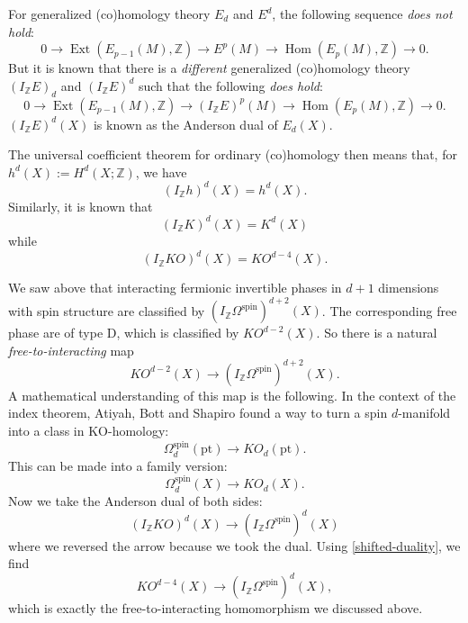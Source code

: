 \documentclass[12pt]{article}
\numberwithin{equation}{section}
\numberwithin{figure}{section}
\theoremstyle{remark}
\def\bZ{\mathbb{Z}}
\def\pt{\mathrm{pt}}
\def\Hom{\mathop{\mathrm{Hom}}}
\def\Ext{\mathop{\mathrm{Ext}}}
\begin{document}
For generalized (co)homology theory $E_d$ and $E^d$, the following sequence \emph{does not hold}:\begin{equation}
0\to \Ext(E_{p-1}(M),\bZ) \to E^p(M) \to \Hom(E_p(M),\bZ) \to 0.
\end{equation}
But it is known that there is a \emph{different} generalized (co)homology theory $(I_\bZ E)_d$ and $(I_\bZ E)^d$ such that the following \emph{does hold}:\begin{equation}
0\to \Ext(E_{p-1}(M),\bZ) \to (I_\bZ E)^p(M) \to \Hom(E_p(M),\bZ) \to 0.
\end{equation}
$(I_\bZ E)^d(X)$ is known as the Anderson dual of $E_d(X)$.

The universal coefficient theorem for ordinary (co)homology then means that, for $h^d(X):=H^d(X;\bZ)$, we have \begin{equation}
(I_\bZ h)^d(X) = h^d(X).
\end{equation}  Similarly, it is known that \begin{equation}
(I_\bZ K)^d(X) = K^d(X)
\end{equation} while \begin{equation}
(I_\bZ KO)^d(X) = KO^{d-4}(X). \label{shifted-duality}
\end{equation}

We saw above that interacting fermionic invertible phases in $d+1$ dimensions with spin structure are classified by 
$(I_\bZ \Omega^\text{spin})^{d+2}(X)$.
The corresponding free phase are of type D, which is classified by $KO^{d-2}(X)$.
So there is a natural \emph{free-to-interacting} map \begin{equation}
KO^{d-2}(X) \to (I_\bZ \Omega^\text{spin})^{d+2}(X). 
\end{equation} 
A mathematical understanding of this map is the following.
In the context of the index theorem, Atiyah, Bott and Shapiro found a way to turn a spin $d$-manifold 
into a class in KO-homology: \begin{equation}
\Omega^\text{spin}_d(\pt)\to KO_d(\pt).
\end{equation} This can be made into a family version: \begin{equation}
\Omega^\text{spin}_d(X)\to KO_d(X).
\end{equation}
Now we take the Anderson dual of both sides: \begin{equation}
(I_\bZ KO)^d(X) \to  (I_\bZ\Omega^\text{spin})^d(X)
\end{equation} where we reversed the arrow because we took the dual. 
Using \eqref{shifted-duality}, we find \begin{equation}
 KO^{d-4}(X) \to  (I_\bZ\Omega^\text{spin})^d(X),
\end{equation}
which is exactly the free-to-interacting homomorphism we discussed above.
\end{document}
